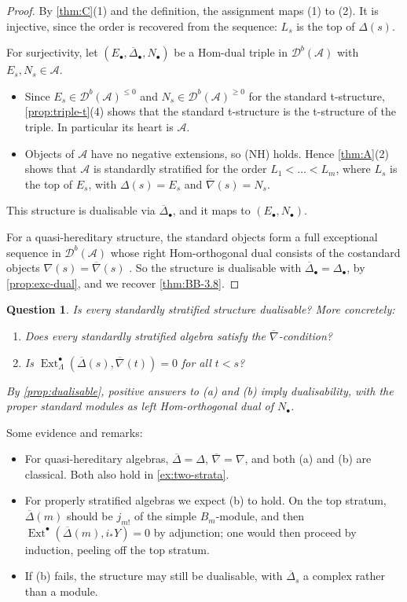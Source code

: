 \documentclass[11pt,reqno]{amsart}
\theoremstyle{plain}
\newtheorem{question}[theorem]{Question}
\theoremstyle{definition}
\theoremstyle{remark}
\DeclareMathOperator{\Ext}{Ext}
\newcommand{\Db}{\mathcal{D}^b}
\newcommand{\nablabar}{\overline{\nabla}}
\newcommand{\Deltabar}{\overline{\Delta}}
\newcommand{\cA}{\mathcal{A}}
\begin{document}
\begin{proof}
By \cref{thm:C}(1) and the definition, the assignment maps (1) to (2). It is injective, since the order is recovered from the sequence: $L_s$ is the top of $\Delta(s)$.

For surjectivity, let $(E_\bullet,\Deltabar_\bullet,N_\bullet)$ be a Hom-dual triple in $\Db(\cA)$ with $E_s,N_s\in\cA$.
\begin{itemize}
\item Since $E_s\in\Db(\cA)^{\le0}$ and $N_s\in\Db(\cA)^{\ge0}$ for the standard t-structure, \cref{prop:triple-t}(4) shows that the standard t-structure is the t-structure of the triple. In particular its heart is $\cA$.
\item Objects of $\cA$ have no negative extensions, so (NH) holds. Hence \cref{thm:A}(2) shows that $\cA$ is standardly stratified for the order $L_1<\dots<L_m$, where $L_s$ is the top of $E_s$, with $\Delta(s)=E_s$ and $\nablabar(s)=N_s$.
\end{itemize}
This structure is dualisable via $\Deltabar_\bullet$, and it maps to $(E_\bullet,N_\bullet)$.

For a quasi-hereditary structure, the standard objects form a full exceptional sequence in $\Db(\cA)$ whose right Hom-orthogonal dual consists of the costandard objects $\nabla(s)=\nablabar(s)$ \cite[\S3]{BB26}. So the structure is dualisable with $\Deltabar_\bullet=\Delta_\bullet$, by \cref{prop:exc-dual}, and we recover \cref{thm:BB-3.8}.
\end{proof}

\begin{question}\label{q:HD4}
Is every standardly stratified structure dualisable? More concretely:
\begin{enumerate}
\item[(a)] Does every standardly stratified algebra satisfy the $\nablabar$-condition?
\item[(b)] Is $\Ext^\bullet_\Lambda(\Deltabar(s),\nablabar(t))=0$ for all $t<s$?
\end{enumerate}
By \cref{prop:dualisable}, positive answers to (a) and (b) imply dualisability, with the proper standard modules as left Hom-orthogonal dual of $N_\bullet$.
\end{question}

Some evidence and remarks:
\begin{itemize}
\item For quasi-hereditary algebras, $\Deltabar=\Delta$, $\nablabar=\nabla$, and both (a) and (b) are classical. Both also hold in \cref{ex:two-strata}.
\item For properly stratified algebras we expect (b) to hold. On the top stratum, $\Deltabar(m)$ should be $j_{m!}$ of the simple $B_m$-module, and then $\Ext^\bullet(\Deltabar(m),i_*Y)=0$ by adjunction; one would then proceed by induction, peeling off the top stratum.
\item If (b) fails, the structure may still be dualisable, with $\Deltabar_s$ a complex rather than a module.
\end{itemize}
\end{document}

